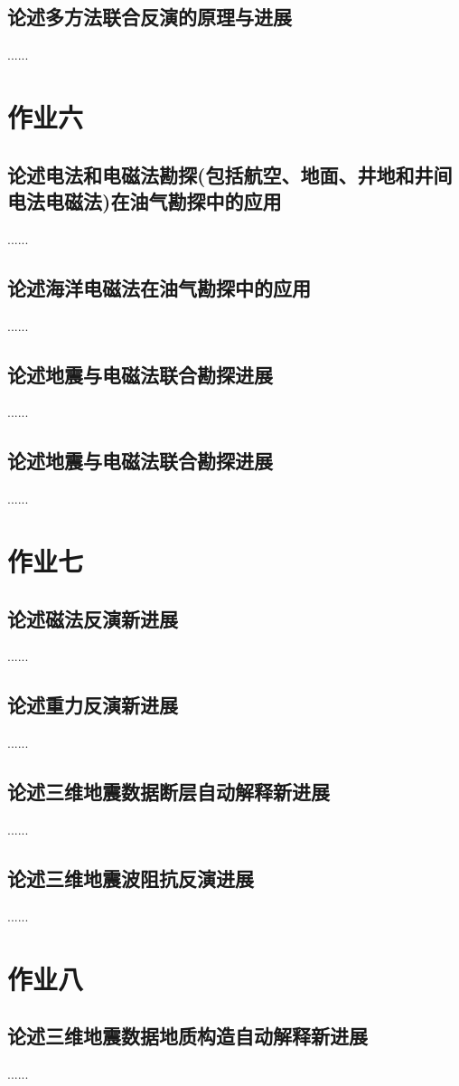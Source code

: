 \documentclass{coursework}
\begin{document}
	\subsection{论述多方法联合反演的原理与进展}
	......
	\section{作业六}
	\subsection{论述电法和电磁法勘探(包括航空、地面、井地和井间电法电磁法)在油气勘探中的应用}
	......
	\subsection{论述海洋电磁法在油气勘探中的应用}
	......
	\subsection{论述地震与电磁法联合勘探进展}
	......
	\subsection{论述地震与电磁法联合勘探进展}
	......
	\section{作业七}
	\subsection{论述磁法反演新进展}
	......
	\subsection{论述重力反演新进展}
	......
	\subsection{论述三维地震数据断层自动解释新进展}
	......
	\subsection{论述三维地震波阻抗反演进展}
	......
	\section{作业八}
	\subsection{论述三维地震数据地质构造自动解释新进展}
	......
\end{document}
